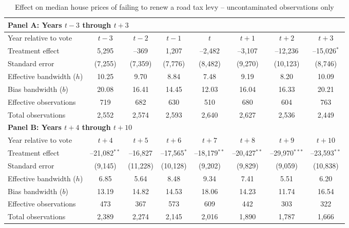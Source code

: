 \begin{table}[H]
  \centering
  \caption{Effect on median house prices of failing to renew a road tax levy -- uncontaminated observations only}
  \label{tab:uncontaminated}
  \begin{threeparttable}
  \begin{tabular}{p{4.5cm}ccccccc}
    \toprule
    \multicolumn{8}{l}{\textbf{Panel A: Years $t-3$ through $t+3$}}\\
    \midrule
    Year relative to vote      & $t\!-\!3$ & $t\!-\!2$ & $t\!-\!1$ & $t$ & $t\!+\!1$ & $t\!+\!2$ & $t\!+\!3$\\
    \midrule
    Treatment effect           &  5,295 &     –369 &   1,207 &   –2,482 &   –3,107 &  –12,236 &  –15,026$^{*}$ \\
    Standard error             & (7,255)& (7,359) & (7,776) & (8,482) & (9,270) & (10,123) & (8,746) \\
    Effective bandwidth ($h$)  & 10.25  &  9.70  &  8.84  &  7.48  &  9.19  &  8.20  & 10.09  \\
    Bias bandwidth ($b$)       & 20.08  & 16.41  & 14.45  & 12.03  & 16.04  & 16.33  & 20.21  \\
    Effective observations     &   719  &   682  &   630  &   510  &   680  &   604  &   763  \\
    Total observations         & 2,552  & 2,574  & 2,593  & 2,640  & 2,627  & 2,536  & 2,449  \\
    \midrule
    \multicolumn{8}{l}{\textbf{Panel B: Years $t+4$ through $t+10$}}\\
    \midrule
    Year relative to vote      & $t\!+\!4$ & $t\!+\!5$ & $t\!+\!6$ & $t\!+\!7$ & $t\!+\!8$ & $t\!+\!9$ & $t\!+\!10$\\
    \midrule
    Treatment effect           &  –21,082$^{**}$ &  –16,827 &  –17,565$^{*}$ &  –18,179$^{**}$ &  –20,427$^{**}$ &  –29,970$^{***}$ &  –23,593$^{**}$ \\
    Standard error             &  (9,145) & (11,228) & (10,128) &  (9,202) &  (9,829) &  (9,059) & (10,838) \\
    Effective bandwidth ($h$)  &   6.85  &  5.64  &  8.48  &  9.34  &  7.41  &  5.51  &  6.20  \\
    Bias bandwidth ($b$)       &  13.19  & 14.82  & 14.53  & 18.06  & 14.23  & 11.74  & 16.54  \\
    Effective observations     &    473  &   367  &   573  &   609  &   442  &   303  &   322  \\
    Total observations         &  2,389  & 2,274  & 2,145  & 2,016  & 1,890  & 1,787  & 1,666  \\

\end{tabular}
\end{threeparttable}
\end{table}
